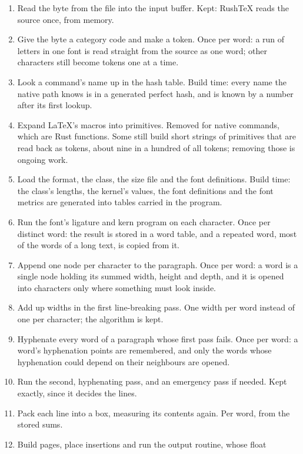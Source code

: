 \documentclass{article}
\numberwithin{equation}{section}
\theoremstyle{definition}
\theoremstyle{remark}
\begin{document}
\begin{enumerate}
  \item\label{item:first} Read the byte from the file into the input buffer.
        Kept: RushTeX reads the source once, from memory.
  \item Give the byte a category code and make a token.
        Once per word: a run of letters in one font is read straight from the source as
        one word; other characters still become tokens one at a time.
  \item Look a command's name up in the hash table.
        Build time: every name the native path knows is in a generated perfect hash,
        and is known by a number after its first lookup.
  \item Expand \LaTeX's macros into primitives.
        Removed for native commands, which are Rust functions. Some still build short
        strings of primitives that are read back as tokens, about nine in a hundred of
        all tokens; removing those is ongoing work.
  \item Load the format, the class, the size file and the font definitions.
        Build time: the class's lengths, the kernel's values, the font definitions and
        the font metrics are generated into tables carried in the program.
  \item Run the font's ligature and kern program on each character.
        Once per distinct word: the result is stored in a word table, and a repeated
        word, most of the words of a long text, is copied from it.
  \item Append one node per character to the paragraph.
        Once per word: a word is a single node holding its summed width, height and
        depth, and it is opened into characters only where something must look inside.
  \item Add up widths in the first line-breaking pass.
        One width per word instead of one per character; the algorithm is kept.
  \item Hyphenate every word of a paragraph whose first pass fails.
        Once per word: a word's hyphenation points are remembered, and only the words
        whose hyphenation could depend on their neighbours are opened.
  \item Run the second, hyphenating pass, and an emergency pass if needed.
        Kept exactly, since it decides the lines.
  \item Pack each line into a box, measuring its contents again.
        Per word, from the stored sums.
  \item Build pages, place insertions and run the output routine, whose float

\end{enumerate}
\end{document}
